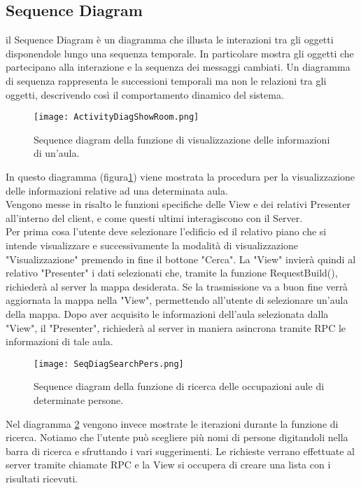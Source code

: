 \FloatBarrier
\subsection{Sequence Diagram}
il Sequence Diagram è un diagramma che illusta le interazioni tra gli oggetti disponendole lungo una sequenza temporale. In particolare mostra gli oggetti che partecipano alla interazione e la sequenza dei messaggi cambiati.
Un diagramma di sequenza rappresenta le successioni temporali ma non le relazioni tra gli oggetti, descrivendo così il comportamento dinamico del sistema.
\begin{figure}[!htb]
\centering%
\texttt{[image: ActivityDiagShowRoom.png]}%
\caption{Sequence diagram della funzione di visualizzazione delle informazioni di un'aula.}\label{fig:umlSeqDRoomInfo}%
\end{figure}
\FloatBarrier
In questo diagramma (figura\ref{fig:umlSeqDRoomInfo}) viene mostrata la procedura per la visualizzazione delle informazioni relative ad una determinata aula. \\
Vengono messe in risalto le funzioni specifiche delle View e dei relativi Presenter all'interno del client, e come questi ultimi interagiscono con il Server.\\
Per prima cosa l'utente deve selezionare l'edificio ed il relativo piano che si intende visualizzare e successivamente la modalità di visualizzazione "Visualizzazione" premendo in fine il bottone "Cerca". La "View" invierà quindi al relativo "Presenter" i dati selezionati che, tramite la funzione RequestBuild(), richiederà al server la mappa desiderata. Se la trasmissione va a buon fine verrà aggiornata la mappa nella "View", permettendo all'utente di selezionare un'aula  della mappa. Dopo aver acquisito le informazioni dell'aula selezionata dalla "View", il "Presenter", richiederà al server in maniera asincrona tramite RPC le informazioni di tale aula.

\begin{figure}[!htb]
\centering
\texttt{[image: SeqDiagSearchPers.png]}
\caption{Sequence diagram della funzione di ricerca delle occupazioni aule di determinate persone.}
\label{fig:umlSeqDSearchPerson}
\end{figure}
\FloatBarrier
Nel diagramma \ref{fig:umlSeqDSearchPerson} vengono invece mostrate le iterazioni durante la funzione di ricerca. Notiamo che l'utente può scegliere più nomi di persone digitandoli nella barra di ricerca e sfruttando i vari suggerimenti. Le richieste verrano effettuate al server tramite chiamate RPC e la View si occupera di creare una lista con i risultati ricevuti.